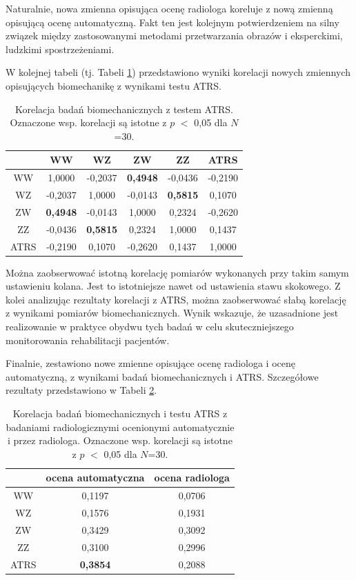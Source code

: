 Naturalnie, nowa zmienna opisująca ocenę radiologa koreluje z nową zmienną opisującą ocenę automatyczną. Fakt ten jest kolejnym potwierdzeniem na silny związek między zastosowanymi metodami przetwarzania obrazów i eksperckimi, ludzkimi spostrzeżeniami. 

W kolejnej tabeli (tj. Tabeli \ref{tab:bioVSatrs}) przedstawiono wyniki korelacji nowych zmiennych opisujących biomechanikę z wynikami testu ATRS. 
\vspace{10px}
\begin{table}[h]
	\centering
	\setlength{\tabcolsep}{3pt}
	\setlength\extrarowheight{2pt}
	\caption{Korelacja badań biomechanicznych z testem ATRS. Oznaczone wsp. korelacji są istotne z $p$ $<$ 0,05 dla $N$=30.}
	\label{tab:bioVSatrs}
	\begin{tabular}{c|c|c|c|c|c}
		&WW&WZ&ZW&ZZ&ATRS \\
		\hline \hline
		WW&1,0000&-0,2037&\textbf{0,4948}&-0,0436&-0,2190\\
		\hline
		WZ&-0,2037&1,0000&-0,0143&\textbf{0,5815}&0,1070\\
		\hline
		ZW&\textbf{0,4948}&-0,0143&1,0000&0,2324&-0,2620\\
		\hline
		ZZ&-0,0436&\textbf{0,5815}&0,2324&1,0000&0,1437\\
		\hline
		ATRS&-0,2190&0,1070&-0,2620&0,1437&1,0000\\
		
		
	\end{tabular}
\end{table}

Można zaobserwować istotną korelację pomiarów wykonanych przy takim samym ustawieniu kolana. Jest to istotniejsze nawet od ustawienia stawu skokowego. Z kolei analizując rezultaty korelacji z ATRS, można zaobserwować słabą korelację z wynikami pomiarów biomechanicznych. Wynik wskazuje, że uzasadnione jest realizowanie w praktyce obydwu tych badań w celu skuteczniejszego monitorowania rehabilitacji pacjentów.

Finalnie, zestawiono nowe zmienne opisujące ocenę radiologa i ocenę automatyczną, z wynikami badań biomechanicznych i ATRS. Szczegółowe rezultaty przedstawiono w Tabeli \ref{tab:bioATRSvspredGT}.
\vspace{10px}
\begin{table}[h]
	\centering
	\setlength{\tabcolsep}{3pt}
	\setlength\extrarowheight{2pt}
	\caption{Korelacja badań biomechanicznych i testu ATRS z badaniami radiologicznymi ocenionymi automatycznie i przez radiologa. Oznaczone wsp. korelacji są istotne z $p$ $<$ 0,05 dla $N$=30.}
	\label{tab:bioATRSvspredGT}
	\begin{tabular}{c|c|c}
		&ocena automatyczna&ocena radiologa \\
		\hline \hline
		WW&0,1197&0,0706\\
		\hline
		WZ&0,1576&0,1931\\
		\hline
		ZW&0,3429&0,3092\\
		\hline
		ZZ&0,3100&0,2996\\
		\hline
		ATRS&\textbf{0,3854}&0,2088\\
		
	
	\end{tabular}
\end{table}

